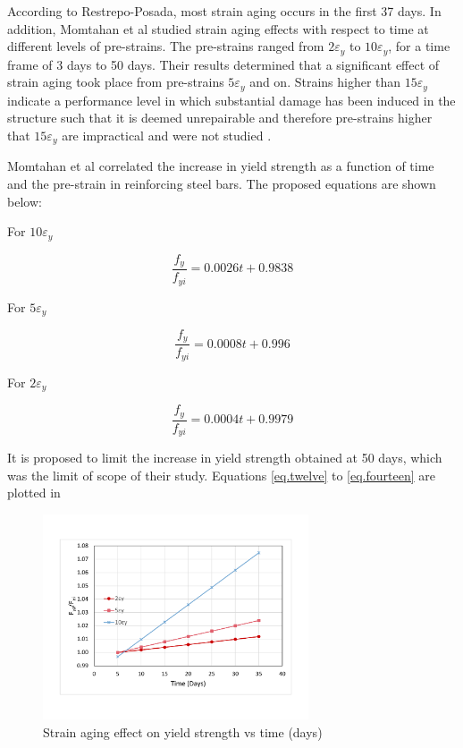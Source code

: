 According to Restrepo-Posada\cite{Restrepo-Posada1994}, most strain aging occurs in the first 37 days. In addition, Momtahan et al  \cite{Momtahan2009} studied strain aging effects with respect to time at different levels of pre-strains. The pre-strains ranged from $2\varepsilon_y $ to $10\varepsilon_y$, for a time frame of 3 days to 50 days. Their results determined that a significant effect of strain aging took place from pre-strains $5\varepsilon_y$ and on. Strains higher than $15\varepsilon_y$ indicate a performance level in which substantial damage has been induced in the structure such that it is deemed unrepairable and therefore pre-strains higher that $15\varepsilon_y$ are impractical and were not studied \cite{Momtahan2009}.

Momtahan et al correlated the increase in yield strength as a function of time and the pre-strain in reinforcing steel bars. The proposed equations are shown below:

For $10\varepsilon_y$

\begin{equation}
  \frac{f_y}{f_{yi}}=0.0026t+0.9838
  \label{eq.twelve}
\end{equation} 

For $5\varepsilon_y$

\begin{equation}
  \frac{f_y}{f_{yi}}=0.0008t+0.996
  \label{eq.thirteen}
\end{equation} 

For $2\varepsilon_y$

\begin{equation}
  \frac{f_y}{f_{yi}}=0.0004t+0.9979
  \label{eq.fourteen}
\end{equation} 

It is proposed to limit the increase in yield strength obtained at 50 days, which was the limit of scope of their study. Equations \ref{eq.twelve} to  \ref{eq.fourteen} are plotted in 

\begin{figure}[htbp]
\centering
\includegraphics[width=0.7\textwidth]{Chapter-2/figs/StrainAging_TimeDependent}
\caption{Strain aging effect on yield strength vs time (days)}
\label{fig:hist4}
\end{figure}

